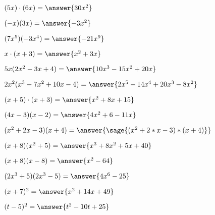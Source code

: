 \documentclass{ximera}
\begin{document}
\begin{problem}
$(5x)\cdot (6x) = \answer{30x^2}$
\end{problem}

\begin{problem}
$(-x)(3x) = \answer{-3x^2} $
\end{problem}

\begin{problem}
$(7x^5)(-3x^4) = \answer{-21x^9}$
\end{problem}

\begin{problem}
$ x\cdot (x+3) = \answer{x^2+3x}$
\end{problem}

\begin{problem}
$5x(2x^2 - 3x +4) = \answer{10x^3-15x^2+20x}$
\end{problem}

\begin{problem}
$2 x^2  (x^3 - 7x^2 + 10x -4) =  \answer{2x^5-14x^4+20x^3-8x^2}$
\end{problem}

\begin{problem}
$ (x+5) \cdot (x+3) = \answer{x^2+8x+15}$
\end{problem}

\begin{problem}
$(4x-3)(x-2) = \answer{4x^2+6-11x}$
\end{problem}

\begin{problem}
$(x^2 + 2x -3) (x + 4) =  \answer{\sage{(x^2 + 2*x -3)*(x + 4)}}$
\end{problem}

\begin{problem}
$(x +8)(x^2+5)=\answer{x^3+8x^2+5x+40}$
\end{problem}

\begin{problem}
$(x + 8)(x-8)=\answer{x^2-64}$
\end{problem}

\begin{problem}
$(2x^3 + 5)(2x^3 - 5)=\answer{4x^6-25}$
\end{problem}

\begin{problem}
$(x+7)^2=\answer{x^2+14x+49}$
\end{problem}

\begin{problem}
$(t-5)^2 = \answer{t^2-10t+25}$
\end{problem}
\end{document}
